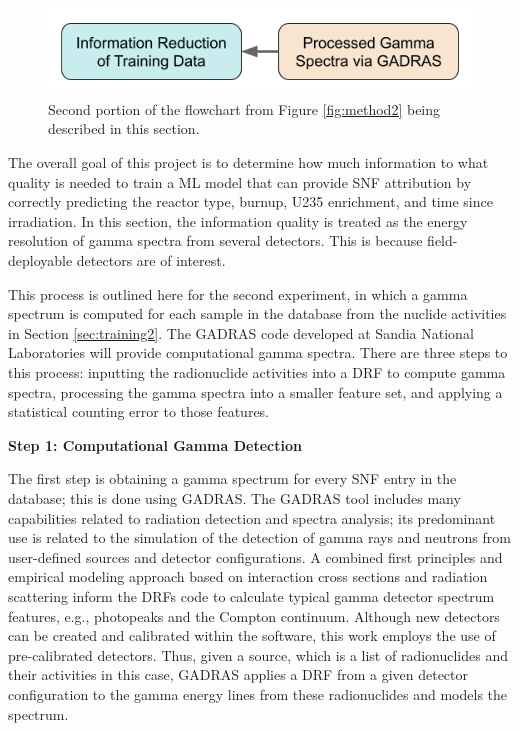 
\begin{figure}[H]
  \centering
  \includegraphics[width=0.7\linewidth]{./chapters/exp2/methodology2_2.png}
  \caption[Second portion of the flowchart from Figure \ref{fig:method2}]
          {Second portion of the flowchart from Figure \ref{fig:method2} being 
           described in this section.}
\end{figure}

The overall goal of this project is to determine how much information to what
quality is needed to train a  \gls{ML} model that can provide \gls{SNF}
attribution by correctly predicting the reactor type, burnup, \gls{U235}
enrichment, and time since irradiation.  In this section, the information
quality is treated as the energy resolution of gamma spectra from several
detectors.  This is because field-deployable detectors are of interest.

This process is outlined here for the second experiment, in which a gamma
spectrum is computed for each sample in the database from the nuclide
activities in Section \ref{sec:training2}.  The \gls{GADRAS} code \cite{gadras}
developed at Sandia National Laboratories will provide computational gamma
spectra. There are three steps to this process: inputting the radionuclide
activities into a \gls{DRF} to compute gamma spectra, processing the gamma
spectra into a smaller feature set, and applying a statistical counting error
to those features.

\noindent \textbf{Step 1: Computational Gamma Detection}

The first step is obtaining a gamma spectrum for every \gls{SNF} entry in the
database; this is done using \gls{GADRAS}. The \gls{GADRAS} tool includes many
capabilities related to radiation detection and spectra analysis; its
predominant use is related to the simulation of the detection of gamma rays and
neutrons from user-defined sources and detector configurations.  A combined
first principles and empirical modeling approach based on interaction cross
sections and radiation scattering inform the \glspl{DRF} code to calculate
typical gamma detector spectrum features, e.g., photopeaks and the Compton
continuum.  Although new detectors can be created and calibrated within the
software, this work employs the use of pre-calibrated detectors.  Thus, given a
source, which is a list of radionuclides and their activities in this case,
\gls{GADRAS} applies a \gls{DRF} from a given detector configuration to the
gamma energy lines from these radionuclides and models the spectrum.
\cite{gadras} 

